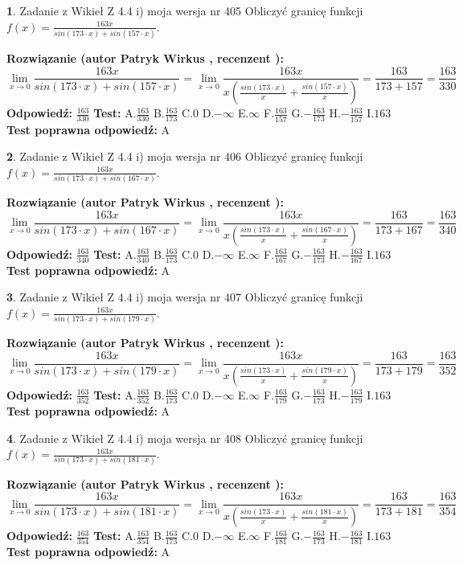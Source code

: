 \documentclass[12pt, a4paper]{article}
\theoremstyle{definition} %
\newtheorem{zad}{}
\newcommand{\zadStart}[1]{\begin{zad}#1\newline}
\newcommand{\zadStop}{\end{zad}}
\newcommand{\rozwStart}[2]{\noindent \textbf{Rozwiązanie (autor #1 , recenzent #2): }\newline}
\newcommand{\rozwStop}{\newline}
\newcommand{\odpStart}{\noindent \textbf{Odpowiedź:}\newline}
\newcommand{\odpStop}{\newline}
\newcommand{\testStart}{\noindent \textbf{Test:}\newline}
\newcommand{\testStop}{\newline}
\newcommand{\kluczStart}{\noindent \textbf{Test poprawna odpowiedź:}\newline}
\newcommand{\kluczStop}{\newline}
\begin{document}
\zadStart{Zadanie z Wikieł Z 4.4 i) moja wersja nr 405}
Obliczyć granicę funkcji $f(x)=\frac{163x}{sin(173\cdot x) +sin(157\cdot x)}$.
\zadStop
\rozwStart{Patryk Wirkus}{}
$$\lim\limits_{x\to 0}\frac{163x}{sin(173\cdot x) +sin(157\cdot x)}=\lim\limits_{x\to 0}\frac{163x}{x(\frac{sin(173\cdot x)}{x}+\frac{sin(157\cdot x)}{x})}=\frac{163}{173+157} = \frac{163}{330}$$
\rozwStop
\odpStart
$\frac{163}{330}$
\odpStop
\testStart
A.$\frac{163}{330}$
B.$\frac{163}{173}$
C.$0$
D.$-\infty$
E.$\infty$
F.$\frac{163}{157}$
G.$-\frac{163}{173}$
H.$-\frac{163}{157}$
I.$163$
\testStop
\kluczStart
A
\kluczStop



\zadStart{Zadanie z Wikieł Z 4.4 i) moja wersja nr 406}
Obliczyć granicę funkcji $f(x)=\frac{163x}{sin(173\cdot x) +sin(167\cdot x)}$.
\zadStop
\rozwStart{Patryk Wirkus}{}
$$\lim\limits_{x\to 0}\frac{163x}{sin(173\cdot x) +sin(167\cdot x)}=\lim\limits_{x\to 0}\frac{163x}{x(\frac{sin(173\cdot x)}{x}+\frac{sin(167\cdot x)}{x})}=\frac{163}{173+167} = \frac{163}{340}$$
\rozwStop
\odpStart
$\frac{163}{340}$
\odpStop
\testStart
A.$\frac{163}{340}$
B.$\frac{163}{173}$
C.$0$
D.$-\infty$
E.$\infty$
F.$\frac{163}{167}$
G.$-\frac{163}{173}$
H.$-\frac{163}{167}$
I.$163$
\testStop
\kluczStart
A
\kluczStop



\zadStart{Zadanie z Wikieł Z 4.4 i) moja wersja nr 407}
Obliczyć granicę funkcji $f(x)=\frac{163x}{sin(173\cdot x) +sin(179\cdot x)}$.
\zadStop
\rozwStart{Patryk Wirkus}{}
$$\lim\limits_{x\to 0}\frac{163x}{sin(173\cdot x) +sin(179\cdot x)}=\lim\limits_{x\to 0}\frac{163x}{x(\frac{sin(173\cdot x)}{x}+\frac{sin(179\cdot x)}{x})}=\frac{163}{173+179} = \frac{163}{352}$$
\rozwStop
\odpStart
$\frac{163}{352}$
\odpStop
\testStart
A.$\frac{163}{352}$
B.$\frac{163}{173}$
C.$0$
D.$-\infty$
E.$\infty$
F.$\frac{163}{179}$
G.$-\frac{163}{173}$
H.$-\frac{163}{179}$
I.$163$
\testStop
\kluczStart
A
\kluczStop



\zadStart{Zadanie z Wikieł Z 4.4 i) moja wersja nr 408}
Obliczyć granicę funkcji $f(x)=\frac{163x}{sin(173\cdot x) +sin(181\cdot x)}$.
\zadStop
\rozwStart{Patryk Wirkus}{}
$$\lim\limits_{x\to 0}\frac{163x}{sin(173\cdot x) +sin(181\cdot x)}=\lim\limits_{x\to 0}\frac{163x}{x(\frac{sin(173\cdot x)}{x}+\frac{sin(181\cdot x)}{x})}=\frac{163}{173+181} = \frac{163}{354}$$
\rozwStop
\odpStart
$\frac{163}{354}$
\odpStop
\testStart
A.$\frac{163}{354}$
B.$\frac{163}{173}$
C.$0$
D.$-\infty$
E.$\infty$
F.$\frac{163}{181}$
G.$-\frac{163}{173}$
H.$-\frac{163}{181}$
I.$163$
\testStop
\kluczStart
A
\kluczStop
\end{document}
